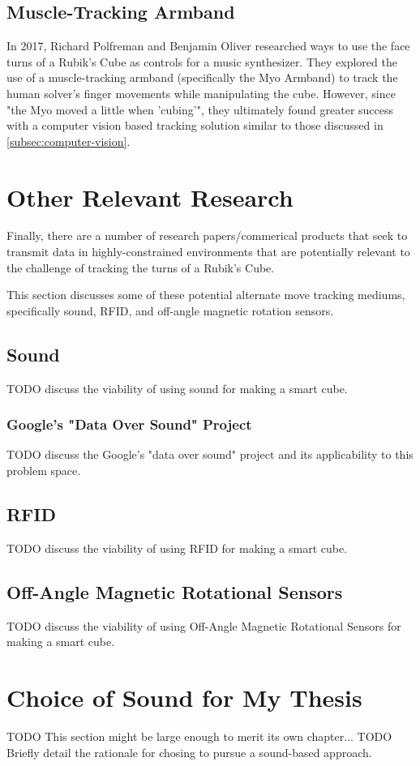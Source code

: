 \subsection{Muscle-Tracking Armband}
In 2017, Richard Polfreman and Benjamin Oliver researched ways to use the face turns of a Rubik's Cube as controls for a music synthesizer. They explored the use of a muscle-tracking armband (specifically the Myo Armband) to track the human solver's finger movements while manipulating the cube. However, since "the Myo moved a little when 'cubing'", they ultimately found greater success with a computer vision based tracking solution similar to those discussed in \ref{subsec:computer-vision}.


\section{Other Relevant Research}
Finally, there are a number of research papers/commerical products that seek to transmit data in highly-constrained environments that are potentially relevant to the challenge of tracking the turns of a Rubik's Cube.

This section discusses some of these potential alternate move tracking mediums, specifically sound, RFID, and off-angle magnetic rotation sensors.

\subsection{Sound}
TODO discuss the viability of using sound for making a smart cube.

\subsubsection{Google's "Data Over Sound" Project}
TODO discuss the Google's "data over sound" project and its applicability to this problem space.

\subsection{RFID}
TODO discuss the viability of using RFID for making a smart cube.

\subsection{Off-Angle Magnetic Rotational Sensors}
TODO discuss the viability of using Off-Angle Magnetic Rotational Sensors for making a smart cube.


\section{Choice of Sound for My Thesis}

TODO This section might be large enough to merit its own chapter...
TODO Briefly detail the rationale for chosing to pursue a sound-based approach.